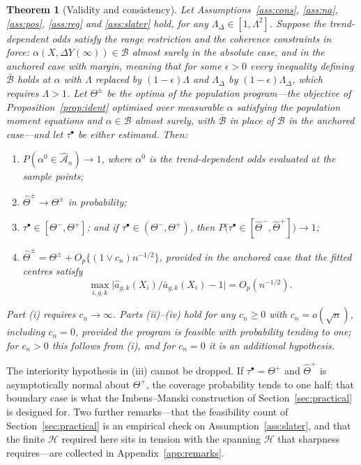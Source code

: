 \documentclass[12pt]{article}
\newtheorem{theorem}{Theorem}
\theoremstyle{remark}
\begin{document}
\begin{theorem}[Validity and consistency]
\label{thm:valid}
Let Assumptions~\ref{ass:cons}, \ref{ass:na}, \ref{ass:pos}, \ref{ass:reg} and
\ref{ass:slater} hold, for any $\Lambda_\Delta \in [1, \Lambda^2]$. Suppose the
trend-dependent odds satisfy the range restriction and the coherence constraints in force:
$\alpha(X, \Delta Y(\infty)) \in \mathcal{B}$ almost surely in the absolute case, and in
the anchored case with margin, meaning that for some $\epsilon > 0$ every inequality
defining $\bar{\mathcal{B}}$ holds at $\alpha$ with $\Lambda$ replaced by
$(1{-}\epsilon)\Lambda$ and $\Lambda_\Delta$ by $(1{-}\epsilon)\Lambda_\Delta$, which
requires $\Lambda > 1$. Let $\Theta^{\pm}$ be the optima of the population program---the
objective of Proposition~\ref{prop:ident} optimised over measurable $\alpha$ satisfying the
population moment equations and $\alpha \in \mathcal{B}$ almost surely, with
$\bar{\mathcal{B}}$ in place of $\mathcal{B}$ in the anchored case---and let
$\tau^\bullet$ be either estimand. Then:
\begin{enumerate}
\item[(i)] $P(\alpha^0 \in \widehat{\mathcal{A}}_n) \to 1$, where $\alpha^0$ is the
trend-dependent odds evaluated at the sample points;
\item[(ii)] $\widehat\Theta^{\pm} \to \Theta^{\pm}$ in probability;
\item[(iii)] $\tau^\bullet \in [\Theta^-, \Theta^+]$; and if
$\tau^\bullet \in (\Theta^-, \Theta^+)$, then
$P\big(\tau^\bullet \in [\widehat\Theta^{-}, \widehat\Theta^{+}]\big) \to 1$;
\item[(iv)] $\widehat\Theta^{\pm} = \Theta^{\pm} + O_p\{(1 \vee c_n) n^{-1/2}\}$,
provided in the anchored case that the fitted centres satisfy
\[
\max_{i,g,k}\big|\widehat a_{g,k}(X_i)/\bar a_{g,k}(X_i) - 1\big| = O_p(n^{-1/2}).
\]
\end{enumerate}
Part (i) requires $c_n \to \infty$. Parts (ii)--(iv) hold for any $c_n \ge 0$ with
$c_n = o(\sqrt n)$, including $c_n = 0$, provided the program is feasible with probability
tending to one; for $c_n > 0$ this follows from (i), and for $c_n = 0$ it is an additional
hypothesis.
\end{theorem}

The interiority hypothesis in (iii) cannot be dropped. If $\tau^\bullet = \Theta^+$ and
$\widehat\Theta^+$ is asymptotically normal about $\Theta^+$, the coverage probability
tends to one half; that boundary case is what the Imbens--Manski construction of
Section~\ref{sec:practical} is designed for. Two further remarks---that the feasibility
count of Section~\ref{sec:practical} is an empirical check on Assumption~\ref{ass:slater},
and that the finite $\mathcal{H}$ required here sits in tension with the spanning
$\mathcal{H}$ that sharpness requires---are collected in Appendix~\ref{app:remarks}.
\end{document}
